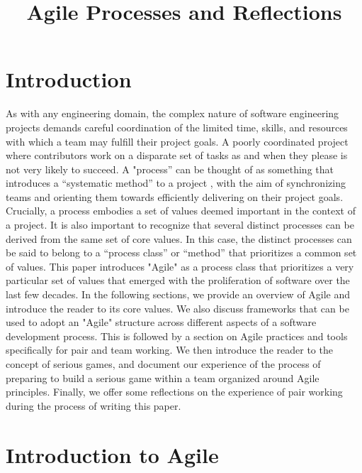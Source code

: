 \documentclass[11pt]{article}
\title{Agile Processes and Reflections}
\author{}
\begin{document}
\maketitle
\tableofcontents %
\listoffigures %

\newpage

\section{Introduction}
    As with any engineering domain, the complex nature of software engineering projects demands careful coordination of the limited time, skills, and resources with which a team may fulfill their project goals. A poorly coordinated project where contributors work on a disparate set of tasks as and when they please is not very likely to succeed. A "process” can be thought of as something that introduces a “systematic method” to a project \citet{sethi}, with the aim of synchronizing teams and orienting them towards efficiently delivering on their project goals. Crucially, a process embodies a set of values deemed important in the context of a project. It is also important to recognize that several distinct processes can be derived from the same set of core values. In this case, the distinct processes can be said to belong to a “process class” or “method” that prioritizes a common set of values. This paper introduces "Agile" as a process class that prioritizes a very particular set of values that emerged with the proliferation of software over the last few decades. In the following sections, we provide an overview of Agile and introduce the reader to its core values. We also discuss frameworks that can be used to adopt an "Agile" structure across different aspects of a software development process. This is followed by a section on Agile practices and tools specifically for pair and team working. We then introduce the reader to the concept of serious games, and document our experience of the process of preparing to build a serious game within a team organized around Agile principles. Finally, we offer some reflections on the experience of pair working during the process of writing this paper.

\section{Introduction to Agile}
\end{document}
